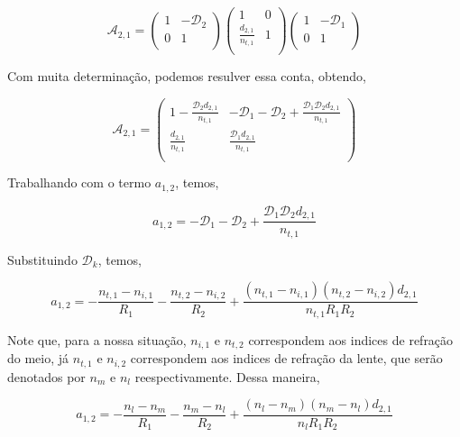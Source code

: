 \documentclass[11pt]{article}
\begin{document}
\begin{pproblem}
\begin{pssolution*}{}{}
\begin{alternativas}
        \[\mathcal{A}_{2,1} = \left(\begin{matrix}
            1 & -\mathcal{D}_2 \\
            0 & 1 \\
            \end{matrix}\right)\begin{pmatrix}
        1 & 0 \\
        \frac{d_{2,1}}{n_{t,1}} & 1 \\
        \end{pmatrix}
        \left(\begin{matrix}
            1 & -\mathcal{D}_1 \\
            0 & 1 \\
            \end{matrix}\right)\]
        \end{alternativas}

        Com muita determinação, podemos resulver essa conta, obtendo, 

        \[\boxed{
        \mathcal{A}_{2,1} = 
        \begin{pmatrix}
        1 - \frac{\mathcal{D}_2d_{2,1}}{n_{t,1}} & - \mathcal{D}_1 - \mathcal{D}_2 + \frac{\mathcal{D}_1\mathcal{D}_2d_{2,1}}{n_{t,1}} \\
        \frac{d_{2,1}}{n_{t,1}} & \frac{\mathcal{D}_1 d_{2,1}}{n_{t,1}}\\
        \end{pmatrix}
        }
        \]

        \item Trabalhando com o termo \(a_{1,2}\), temos, 
        
        \[a_{1,2} = -\mathcal{D}_1 - \mathcal{D}_2 + \frac{\mathcal{D}_1\mathcal{D}_2d_{2,1}}{n_{t,1}}\]

        Substituindo \(\mathcal{D}_k\), temos, 

        \[a_{1,2} = -\frac{n_{t,1}-n_{i,1}}{R_1} - \frac{n_{t,2}-n_{i,2}}{R_2} + \frac{(n_{t,1}-n_{i,1})(n_{t,2}-n_{i,2})d_{2,1}}{n_{t,1}R_1R_2}\]

        Note que, para a nossa situação, \(n_{i,1}\) e \(n_{t,2}\) correspondem aos indices de refração do meio, já \(n_{t,1}\) e \(n_{i,2}\) correspondem aos indices de refração da lente, que serão denotados por \(n_m\) e \(n_l\) reespectivamente. Dessa maneira, 

        \[a_{1,2} = -\frac{n_{l}-n_{m}}{R_1} - \frac{n_{m}-n_{l}}{R_2} + \frac{(n_{l}-n_{m})(n_{m}-n_{l})d_{2,1}}{n_lR_1R_2}\]


\end{pssolution*}
\end{pproblem}
\end{document}

